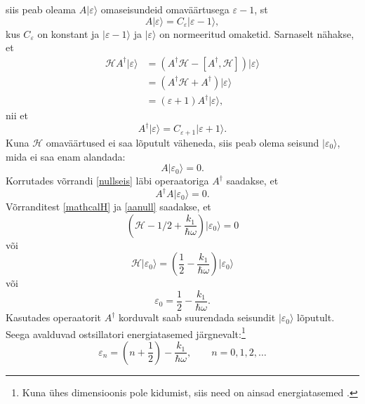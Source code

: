\documentclass{trkut}%
\renewcommand\ket[1]{{|{#1}\rangle}}
\begin{document}
siis peab oleama $A\ket{\varepsilon}$ omaseisundeid omaväärtusega $\varepsilon - 1$, st
\begin{equation}
    A\ket{\varepsilon}=C_\varepsilon \ket{\varepsilon -1},
    \label{cepsilon}
\end{equation}
kus $C_\varepsilon$ on konstant ja $\ket{\varepsilon -1}$ ja $\ket{\varepsilon}$ on normeeritud omaketid.
Sarnaselt nähakse, et
\begin{align}
        \mathcal{H}A^\dagger\ket{\varepsilon}&=\left(A^\dagger\mathcal{H}-[A^\dagger, \mathcal{H}]\right)\ket{\varepsilon} \nonumber \\
        &=(A^\dagger\mathcal{H}+A^\dagger)\ket{\varepsilon} \nonumber \\
        &=(\varepsilon + 1)A^\dagger\ket{\varepsilon},
\end{align}
nii et
\begin{equation}
    A^\dagger\ket{\varepsilon}=C_{\varepsilon+1} \ket{\varepsilon+1}.
    \label{cepsilon1}
\end{equation}
Kuna $\mathcal{H}$ omaväärtused ei saa lõputult väheneda, siis peab olema seisund $\ket{\varepsilon_0}$, mida ei saa enam alandada:
\begin{equation}
    A\ket{\varepsilon_0}=0.
    \label{nullseis}
\end{equation}
Korrutades võrrandi \eqref{nullseis} läbi operaatoriga $A^\dagger$ saadakse, et
\begin{equation}
    A^\dagger A\ket{\varepsilon_0}=0.
    \label{aanull}
\end{equation}
Võrranditest \eqref{mathcalH} ja \eqref{aanull} saadakse, et
\begin{equation}
    \left(\mathcal{H}-1/2 + \frac{k_1}{\hbar \omega} \right)\ket{\varepsilon_0}=0
\end{equation}
või
\begin{equation}
    \mathcal{H}\ket{\varepsilon_0}=\left(\frac{1}{2} - \frac{k_1}{\hbar \omega}\right) \ket{\varepsilon_0}
\end{equation}
või
\begin{equation}
    \varepsilon_0=\frac{1}{2} - \frac{k_1}{\hbar \omega}.
\end{equation}
Kasutades operaatorit $A^\dagger$ korduvalt saab suurendada seisundit $\ket{\varepsilon_0}$ lõputult. Seega avalduvad ostsillatori energiatasemed järgnevalt:\footnote{Kuna ühes dimensioonis pole kidumist, siis need on ainsad energiatasemed \parencite[176-177]{shankar94}.}
\begin{equation}
    \varepsilon_n=\left(n+\frac{1}{2}\right)-\frac{k_1}{\hbar \omega}, \qquad n=0, 1, 2,\dots
\end{equation}
\end{document}
